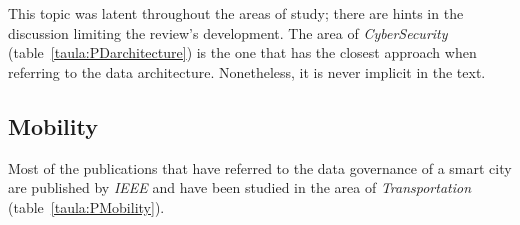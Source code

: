 \documentclass[a4paper,12pt,twoside]{ThesisStyle}
\begin{document}
This topic was latent throughout the areas of study; there are hints in the discussion limiting the review's development. The area of \textit{CyberSecurity} (table~\ref{taula:PDarchitecture}) is the one that has the closest approach when referring to the data architecture. Nonetheless, it is never implicit in the text.

\subsection{Mobility}

Most of the publications that have referred to the data governance of a smart city are published by \textit{IEEE} and have been studied in the area of \textit{Transportation} (table~\ref{taula:PMobility}). 

\renewcommand{\arraystretch}{1.5}
\end{document}
